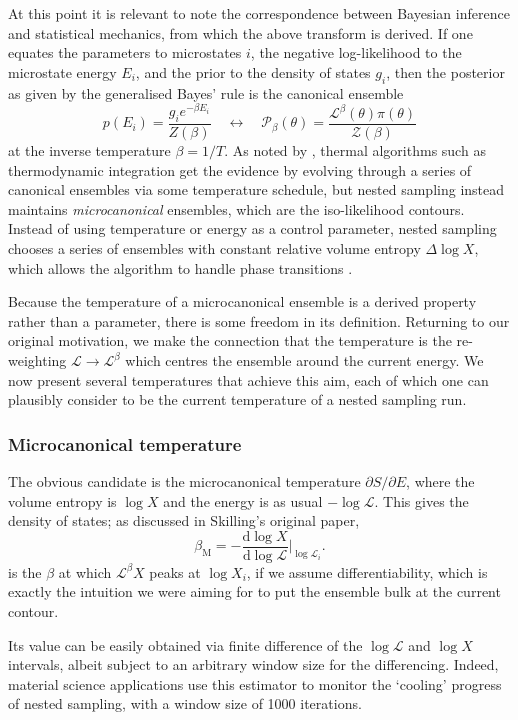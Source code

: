 \documentclass[usenatbib]{mnras}
\newcommand{\Like}{\mathcal{L}}
\begin{document}
\par
At this point it is relevant to note the correspondence between Bayesian inference and statistical mechanics, from which the above transform is derived. If one equates the parameters to microstates $i$, the negative log-likelihood to the microstate energy $E_i$, and the prior to the density of states $g_i$, then the posterior as given by the generalised Bayes' rule is the canonical ensemble
\begin{equation}
    p(E_i) = \frac{g_i e^{-\beta E_i}}{Z(\beta)} \quad \leftrightarrow \quad \mathcal{P}_\beta(\theta) = \frac{\mathcal{L}^{\beta}(\theta)\pi(\theta)}{\mathcal{Z}(\beta)}
\end{equation}
at the inverse temperature $\beta = 1/T$. As noted by \citet{demons}, thermal algorithms such as thermodynamic integration \citep{path_sampling} get the evidence by evolving through a series of canonical ensembles via some temperature schedule, but nested sampling instead maintains \textit{microcanonical} ensembles, which are the iso-likelihood contours. Instead of using temperature \citep{simulated_annealing, parallel_tempering} or energy \citep{wang_landau} as a control parameter, nested sampling chooses a series of ensembles with constant relative volume entropy $\Delta \log X$, which allows the algorithm to handle phase transitions \citep{baldock}.
\par
Because the temperature of a microcanonical ensemble is a derived property rather than a parameter, there is some freedom in its definition. Returning to our original motivation, we make the connection that the temperature is the re-weighting $\Like \to \Like^{\beta}$ which centres the ensemble around the current energy. We now present several temperatures that achieve this aim, each of which one can plausibly consider to be the current temperature of a nested sampling run.

\subsubsection{Microcanonical temperature}\label{sec:microcanonical_temperature}
The obvious candidate is the microcanonical temperature $\partial S/\partial E$, where the volume entropy is $\log X$ and the energy is as usual $-\log \Like$. This gives the density of states; as discussed in Skilling's original paper,
\begin{equation}
    \beta_\mathrm{M}  = - \frac{\mathrm{d} \log X}{\mathrm{d} \log \Like} \Bigg\vert_{\log \Like_i}.
\end{equation}
is the $\beta$ at which $\Like^{\beta} X$ peaks at $\log X_i$, if we assume differentiability, which is exactly the intuition we were aiming for to put the ensemble bulk at the current contour. 
\par
Its value can be easily obtained via finite difference of the $\log \Like$ and $\log X$ intervals, albeit subject to an arbitrary window size for the differencing. Indeed, material science applications \citep{Baldock_2017} use this estimator to monitor the `cooling' progress of nested sampling, with a window size of 1000 iterations.
\end{document}
